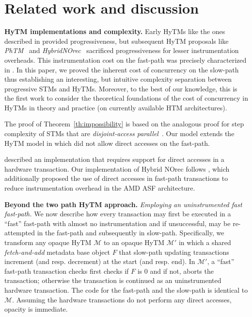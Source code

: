 \section{Related work and discussion}
\label{sec:rel}
%
\vspace{1mm}\noindent\textbf{HyTM implementations and complexity.}
Early HyTMs like the ones described in \cite{damronhytm, kumarhytm} provided progressiveness, but
subsequent HyTM proposals like \emph{PhTM}~\cite{phasedtm} and \emph{HybridNOrec}~\cite{hybridnorec} sacrificed progressiveness for lesser instrumentation overheads.
This instrumentation cost on the fast-path was precisely characterized in \cite{htmdisc15}.
In this paper, we proved the inherent cost of concurrency on the slow-path thus establishing an interesting, but intuitive complexity separation between progressive STMs and HyTMs.
Moreover, to the best of our knowledge, this is the first work to consider the theoretical foundations of the cost of concurrency in HyTMs in theory and practice (on currently available HTM architectures).

The proof of Theorem~\ref{th:impossibility} is based on the analogous proof for step complexity of STMs that are \emph{disjoint-access parallel}~\cite{prog15-pact, tm-book}.
Our model extends the HyTM model in \cite{hytm14disc} which did not allow direct accesses on the fast-path.

\cite{kumarhytm} described an implementation that requires support for direct accesses in a hardware transaction. 
Our implementation of Hybrid NOrec follows \cite{hynorecriegel}, which additionally proposed the use of direct accesses
in fast-path transactions to reduce instrumentation overhead in the AMD ASF architecture.

\vspace{1mm}\noindent\textbf{Beyond the two path HyTM approach.}
\vspace{1mm}\noindent\textit{Employing an uninstrumented fast fast-path.}
We now describe how every transaction may first be executed in a ``fast'' fast-path with almost no instrumentation
and if unsuccessful, may be re-attempted in the fast-path and subsequently in slow-path.
Specifically, we transform any opaque HyTM $\mathcal{M}$ to an opaque
HyTM $\mathcal{M}'$ in which a shared \emph{fetch-and-add} metadata base object $F$ that slow-path updating transactions
increment (and resp. decrement) at the start (and resp. end). In $\mathcal{M}'$, a ``fast'' fast-path transaction checks first checks if $F$ is $0$
and if not, aborts the transaction; otherwise the transaction is continued as an uninstrumented hardware transaction.
The code for the fast-path and the slow-path is identical to $\mathcal{M}$.
Assuming the hardware transactions do not perform any direct accesses, opacity is immediate.

